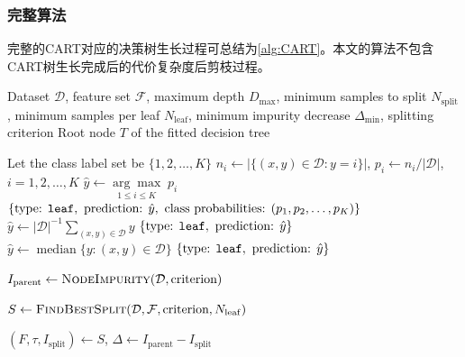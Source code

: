\subsubsection{完整算法}
完整的\gls{CART}对应的决策树生长过程可总结为\cref{alg:CART}。本文的算法不包含CART树生长完成后的代价复杂度后剪枝过程。
\begin{algorithm}[H]
	\caption{Classification and Regression Tree}
	\label{alg:CART}
	\begin{algorithmic}[1]
		\Require Dataset $\mathcal{D}$, feature set $\mathcal{F}$,
		maximum depth $D_{\max}$,
		minimum samples to split $N_{\mathrm{split}}$,
		minimum samples per leaf $N_{\mathrm{leaf}}$,
		minimum impurity decrease $\Delta_{\min}$,
		splitting criterion
		\Ensure Root node $T$ of the fitted decision tree
		
		\State Let the class label set be $\{1,2,\dots,K\}$
		\State $n_i\gets|\{(x,y)\in\mathcal{D}:y=i\}|$,
		$p_i\gets n_i/|\mathcal{D}|$, $i=1,2,\dots,K$
		\State $\hat{y}\gets\underset{1\leqslant i\leqslant K}{\arg\max}\;p_i$
		\State \Return
		$\{\text{type: \texttt{leaf}},\text{ prediction: }\hat{y},
		\text{ class probabilities: }(p_1,p_2,\dots,p_K)\}$
		\State $\hat{y}\gets|\mathcal{D}|^{-1}
		\sum\limits_{(x,y)\in\mathcal{D}}y$
		\State \Return
		$\{\text{type: \texttt{leaf}},\text{ prediction: }\hat{y}\}$
		\State $\hat{y}\gets
		\operatorname{median}\{y:(x,y)\in\mathcal{D}\}$
		\State \Return
		$\{\text{type: \texttt{leaf}},\text{ prediction: }\hat{y}\}$
		\EndIf
		\EndFunction
		
		\State \Return {}
		\EndIf
		
		\State $I_{\mathrm{parent}}\gets
		\Call{NodeImpurity}{\mathcal{D},\text{criterion}}$
		
		\State $S\gets
		\Call{FindBestSplit}
		{\mathcal{D},\mathcal{F},\text{criterion},N_{\mathrm{leaf}}}$
		
		\State \Return {}
		\EndIf
		
		\State $(F,\tau,I_{\mathrm{split}})\gets S$, $\Delta\gets I_{\mathrm{parent}}-I_{\mathrm{split}}$
		

\end{algorithmic}
\end{algorithm}

